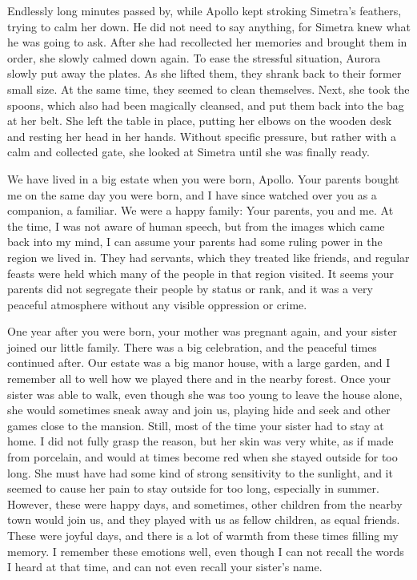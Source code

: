 Endlessly long minutes passed by, while Apollo kept stroking Simetra's feathers, trying to calm her down. He did not need to say anything, for Simetra knew what he was going to ask. After she had recollected her memories and brought them in order, she slowly calmed down again. To ease the stressful situation, Aurora slowly put away the plates. As she lifted them, they shrank back to their former small size. At the same time, they seemed to clean themselves. Next, she took the spoons, which also had been magically cleansed, and put them back into the bag at her belt. She left the table in place, putting her elbows on the wooden desk and resting her head in her hands. Without specific pressure, but rather with a calm and collected gate, she looked at Simetra until she was finally ready.

\fancybreaker{}

We have lived in a big estate when you were born, Apollo. Your parents bought me on the same day you were born, and I have since watched over you as a companion, a familiar. We were a happy family: Your parents, you and me. At the time, I was not aware of human speech, but from the images which came back into my mind, I can assume your parents had some ruling power in the region we lived in. They had servants, which they treated like friends, and regular feasts were held which many of the people in that region visited. It seems your parents did not segregate their people by status or rank, and it was a very peaceful atmosphere without any visible oppression or crime.

One year after you were born, your mother was pregnant again, and your sister joined our little family. There was a big celebration, and the peaceful times continued after. Our estate was a big manor house, with a large garden, and I remember all to well how we played there and in the nearby forest. Once your sister was able to walk, even though she was too young to leave the house alone, she would sometimes sneak away and join us, playing hide and seek and other games close to the mansion. Still, most of the time your sister had to stay at home. I did not fully grasp the reason, but her skin was very white, as if made from porcelain, and would at times become red when she stayed outside for too long. She must have had some kind of strong sensitivity to the sunlight, and it seemed to cause her pain to stay outside for too long, especially in summer. However, these were happy days, and sometimes, other children from the nearby town would join us, and they played with us as fellow children, as equal friends. These were joyful days, and there is a lot of warmth from these times filling my memory. I remember these emotions well, even though I can not recall the words I heard at that time, and can not even recall your sister's name.

